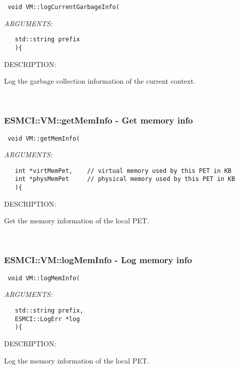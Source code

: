 {  
\begin{verbatim} void VM::logCurrentGarbageInfo(\end{verbatim}{\em ARGUMENTS:}
\begin{verbatim}   std::string prefix
   ){\end{verbatim}
{\sf DESCRIPTION:\\ }


     Log the garbage collection information of the current context.
   
 
\mbox{}\hrulefill\
 
\subsubsection [ESMCI::VM::getMemInfo] {ESMCI::VM::getMemInfo - Get memory info}


  
\begin{verbatim} void VM::getMemInfo(\end{verbatim}{\em ARGUMENTS:}
\begin{verbatim}   int *virtMemPet,    // virtual memory used by this PET in KB
   int *physMemPet     // physical memory used by this PET in KB
   ){\end{verbatim}
{\sf DESCRIPTION:\\ }


     Get the memory information of the local PET.
   
 
\mbox{}\hrulefill\
 
\subsubsection [ESMCI::VM::logMemInfo] {ESMCI::VM::logMemInfo - Log memory info}


  
\begin{verbatim} void VM::logMemInfo(\end{verbatim}{\em ARGUMENTS:}
\begin{verbatim}   std::string prefix,
   ESMCI::LogErr *log
   ){\end{verbatim}
{\sf DESCRIPTION:\\ }


     Log the memory information of the local PET.
   
}
